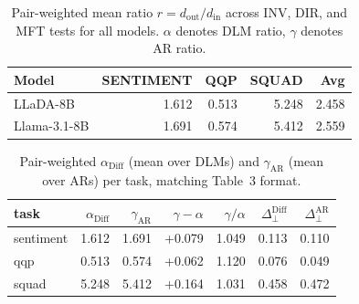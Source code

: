 \begin{table}[t]
\centering
\caption{Pair-weighted mean ratio $r=d_\mathrm{out}/d_\mathrm{in}$ across INV, DIR, and MFT tests for all models. $\alpha$ denotes DLM ratio, $\gamma$ denotes AR ratio.}
\label{tab:all-model-contraction}
\small
\begin{tabular}{lrrrr}
\toprule
Model & SENTIMENT & QQP & SQUAD & Avg \\
\midrule
LLaDA-8B & 1.612 & 0.513 & 5.248 & 2.458 \\
\midrule
Llama-3.1-8B & 1.691 & 0.574 & 5.412 & 2.559 \\
\bottomrule
\end{tabular}
\end{table}

\begin{table}[t]
\centering
\caption{Pair-weighted $\alpha_\mathrm{Diff}$ (mean over DLMs) and $\gamma_\mathrm{AR}$ (mean over ARs) per task, matching Table~3 format.}
\label{tab:expansion-alpha-gamma}
\small
\begin{tabular}{lrrrrrr}
\toprule
task & $\alpha_\mathrm{Diff}$ & $\gamma_\mathrm{AR}$ & $\gamma-\alpha$ & $\gamma/\alpha$ & $\Delta^\mathrm{Diff}_\perp$ & $\Delta^\mathrm{AR}_\perp$ \\
\midrule
sentiment & 1.612 & 1.691 & +0.079 & 1.049 & 0.113 & 0.110 \\
qqp & 0.513 & 0.574 & +0.062 & 1.120 & 0.076 & 0.049 \\
squad & 5.248 & 5.412 & +0.164 & 1.031 & 0.458 & 0.472 \\
\bottomrule
\end{tabular}
\end{table}
